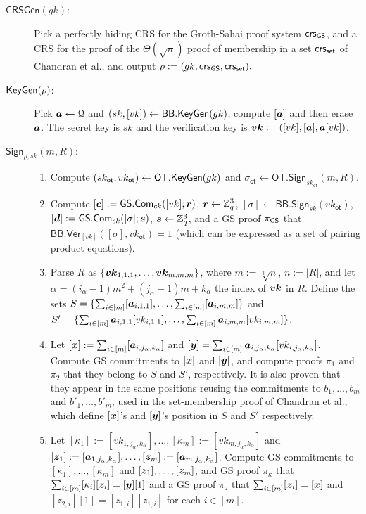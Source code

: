 \begin{description}
\item[$\mathsf{CRSGen}(gk)$:] Pick a perfectly hiding CRS for the Groth-Sahai proof system $\mathsf{crs}_{\mathsf{GS}}$, and a CRS for the proof of the $\Theta(\sqrt{n})$ proof of membership in a set $\mathsf{crs}_{\mathsf{set}}$ of Chandran et al., and output $\rho:=(gk,\mathsf{crs}_{\mathsf{GS}},\mathsf{crs}_{\mathsf{set}}).$
\item[$\mathsf{KeyGen}(\rho)$:] Pick ${\boldsymbol{a}}\gets\mathcal{Q}$ and $(sk,[vk])\gets\mathsf{BB}.\mathsf{KeyGen}(gk)$, compute $[{\boldsymbol{a}}]$ and then erase ${\boldsymbol{a}}$. The secret key is $sk$ and the verification key is ${\boldsymbol{vk}}:=([vk],[{\boldsymbol{a}}],{\boldsymbol{a}}[vk])$.
\item[$\mathsf{Sign}_{\rho,sk}(m,R)$:]
\begin{enumerate}
\item Compute $(sk_\mathsf{ot},vk_\mathsf{ot})\gets\mathsf{OT}.\mathsf{KeyGen}(gk)$ and $\sigma_\mathsf{ot}\gets\allowbreak\mathsf{OT}.\allowbreak\mathsf{Sign}_{sk_\mathsf{ot}}(m,R)$.
\item Compute $[{\boldsymbol{c}}]:={\mathsf{GS}}.\mathsf{Com}_{ck}([vk];{\boldsymbol{r}})$, ${\boldsymbol{r}}\gets\mathbb{Z}_q^3$, $[\sigma]\gets\mathsf{BB}.\mathsf{Sign}_{sk}(vk_\mathsf{ot})$, $[{\boldsymbol{d}}]:={\mathsf{GS}}.\mathsf{Com}_{ck}([\sigma];{\boldsymbol{s}})$, ${\boldsymbol{s}}\gets\mathbb{Z}_q^3$, and a GS proof $\pi_{\mathsf{GS}}$ that $\mathsf{BB}.\mathsf{Ver}_{[vk]}(\allowbreak[\sigma],vk_\mathsf{ot})=1$ (which can be expressed as a set of pairing product equations).
\item Parse $R$ as $\{{\boldsymbol{vk}}_{1,1,1},\ldots,{\boldsymbol{vk}}_{m,m,m}\}$, where $m:=\sqrt[3]{n}$, $n:=|R|$, and let $\alpha=(i_\alpha-1)m^2+(j_\alpha-1)m + k_\alpha$ the index of ${\boldsymbol{vk}}$ in $R$. Define the sets $S=\{\sum_{i\in[m]}[{\boldsymbol{a}}_{i,1,1}],\allowbreak\ldots,\sum_{i\in[m]}[{\boldsymbol{a}}_{i,m,m}]\}$ and\\ $S'=\{\sum_{i\in[m]}{\boldsymbol{a}}_{i,1,1}[vk_{i,1,1}],\allowbreak\ldots,\sum_{i\in[m]}{\boldsymbol{a}}_{i,m,m}[vk_{i,m,m}]\}$.
\item Let $[{\boldsymbol{x}}]:=\sum_{i\in[m]}[{\boldsymbol{a}}_{i,j_\alpha,k_\alpha}]$ and $[{\boldsymbol{y}}]=\sum_{i\in[m]}{\boldsymbol{a}}_{i,j_\alpha,k_\alpha}[vk_{i,j_\alpha,k_\alpha}]$. Compute GS commitments to $[{\boldsymbol{x}}]$ and $[{\boldsymbol{y}}]$, and compute proofs $\pi_1$ and $\pi_2$ that they belong to $S$ and $S'$, respectively. It is also proven that they appear in the same positions reusing the commitments to $b_1,\ldots,b_{m}$ and $b'_1,\ldots,b'_{m}$, used in the set-membership proof of Chandran et al., which define $[{\boldsymbol{x}}]$'s and $[{\boldsymbol{y}}]$'s position in $S$ and $S'$ respectively.
\item Let $[\kappa_1]:=[vk_{1,j_\alpha,k_\alpha}],\ldots,[\kappa_m]:=[vk_{m,j_\alpha,k_\alpha}]$ and $[{\boldsymbol{z}}_1]:=\allowbreak[{\boldsymbol{a}}_{1,j_\alpha,k_\alpha}],\allowbreak\ldots,[{\boldsymbol{z}}_m]:=[{\boldsymbol{a}}_{m,j_\alpha,k_\alpha}]$. Compute GS commitments to $[\kappa_1],\ldots,[\kappa_m]$ and $[{\boldsymbol{z}}_1],\ldots,[{\boldsymbol{z}}_m]$, and GS proof $\pi_\kappa$ that $\sum_{i\in[m]}[\kappa_i][{\boldsymbol{z}}_i]=[{\boldsymbol{y}}][1]$ and a GS proof $\pi_{z}$ that $\sum_{i\in[m]}[{\boldsymbol{z}}_i]=[{\boldsymbol{x}}]$ and $[z_{2,i}][1]=[z_{1,i}][z_{1,i}]$ for each $i\in[m]$.

\end{enumerate}
\end{description}
